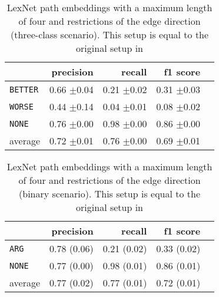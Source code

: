 	
	\begin{table}[h] 
		\centering 
		\caption{LexNet path embeddings with a maximum length of four and restrictions of the edge direction (three-class scenario). This setup is equal to the original setup in \cite{DBLP:journals/corr/ShwartzD16}} 
		\label{  }
		\begin{tabular}{@{}lrrrr@{}}
			\toprule
			        & precision                & recall                   & f1 score                 \\ \midrule 
\texttt	{BETTER}	&	 0.66 \scriptsize{$\pm$0.04} &	 0.21 \scriptsize{$\pm$0.02} &	 0.31 \scriptsize{$\pm$0.03}  \\ 
\texttt	{WORSE}	&	 0.44 \scriptsize{$\pm$0.14} &	 0.04 \scriptsize{$\pm$0.01} &	 0.08 \scriptsize{$\pm$0.02}  \\ 
\texttt	{NONE}	&	 0.76 \scriptsize{$\pm$0.00} &	 0.98 \scriptsize{$\pm$0.00} &	 0.86 \scriptsize{$\pm$0.00}  \\ 
average	&	 0.72 \scriptsize{$\pm$0.01} &	 0.76 \scriptsize{$\pm$0.00} &	 0.69 \scriptsize{$\pm$0.01}  \\ 
			\bottomrule
		\end{tabular}
	\end{table}
	
	\begin{table}[h] 
		\centering 
		\caption{LexNet path embeddings with a maximum length of four and restrictions of the edge direction (binary scenario). This setup is equal to the original setup in \cite{DBLP:journals/corr/ShwartzD16}} 
		\label{  }
		\begin{tabular}{@{}lrrrr@{}}
			\toprule
			        & precision                & recall                   & f1 score                 \\ \midrule 
			\texttt{ARG}     & 0.78 \scriptsize{(0.06)} & 0.21 \scriptsize{(0.02)} & 0.33 \scriptsize{(0.02)} \\ 
			\texttt{NONE}    & 0.77 \scriptsize{(0.00)} & 0.98 \scriptsize{(0.01)} & 0.86 \scriptsize{(0.01)} \\ 
			average & 0.77 \scriptsize{(0.02)} & 0.77 \scriptsize{(0.01)} & 0.72 \scriptsize{(0.01)} \\ 
			\bottomrule
		\end{tabular}
	\end{table}
	
